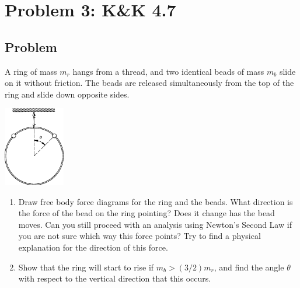 \documentclass[solutions]{esg8012pset}
\begin{document}
\section*{Problem 3: K\&K 4.7}
\subsection*{Problem}
  A ring of mass $m_r$ hangs from a thread, and two identical beads of mass $m_b$ slide on it without friction. The beads are released simultaneously from the top of the ring and slide down opposite sides.
  \begin{center}\includegraphics[width=0.2\textwidth]{ps06_2}\end{center}
  \begin{enumerate}
    \item Draw free body force diagrams for the ring and the beads. What direction is the force of the bead on the ring pointing? Does it change has the bead moves. Can you still proceed with an analysis using Newton's Second Law if you are not sure which way this force points? Try to find a physical explanation for the direction of this force.
    \item Show that the ring will start to rise if $m_b > (3/2)m_r$, and find the angle $\theta$ with respect to the vertical direction that this occurs.
  \end{enumerate}
\end{document}
